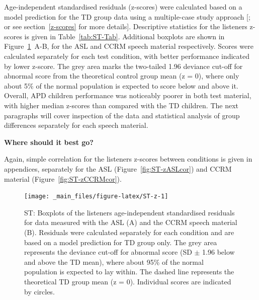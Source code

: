 \documentclass[a4paper, twoside]{templates/ociamthesis}
\begin{document}
Age-independent standardised residuals (z-scores) were calculated based on a model prediction for the TD group data using a multiple-case study approach {[}\textcite{Ramus2003}; or see section~\ref{z-scores} for more details{]}. Descriptive statistics for the listeners z-scores is given in Table~\ref{tab:ST-Tab}. Additional boxplots are shown in Figure~\ref{fig:ST-z}~A-B, for the ASL and CCRM speech material respectively. Scores were calculated separately for each test condition, with better performance indicated by lower z-score. The grey area marks the two-tailed 1.96 deviance cut-off for abnormal score from the theoretical control group mean (z = 0), where only about 5\% of the normal population is expected to score below and above it. Overall, APD children performance was noticeably poorer in both test material, with higher median z-scores than compared with the TD children. The next paragraphs will cover inspection of the data and statistical analysis of group differences separately for each speech material.\\

\begin{correction}
\textbf{Where should it best go?}

Again, simple correlation for the listeners z-scores between conditions
is given in appendices, separately for the ASL
(Figure~\ref{fig:ST-zASLcor}) and CCRM material
(Figure~\ref{fig:ST-zCCRMcor}).
\end{correction}

\begin{figure}

{\centering \texttt{[image: \_main\_files/figure-latex/ST-z-1]} 

}

\caption{ST: Boxplots of the listeners age-independent standardised residuals for data measured with the ASL (A) and the CCRM speech material (B). Residuals were calculated separately for each condition and are based on a model prediction for TD group only. The grey area represents the deviance cut-off for abnormal score (SD $\pm$ 1.96 below and above the TD mean), where about 95\% of the normal population is expected to lay within. The dashed line represents the theoretical TD group mean (z = 0). Individual scores are indicated by circles.}\label{fig:ST-z}
\end{figure}
\end{document}
